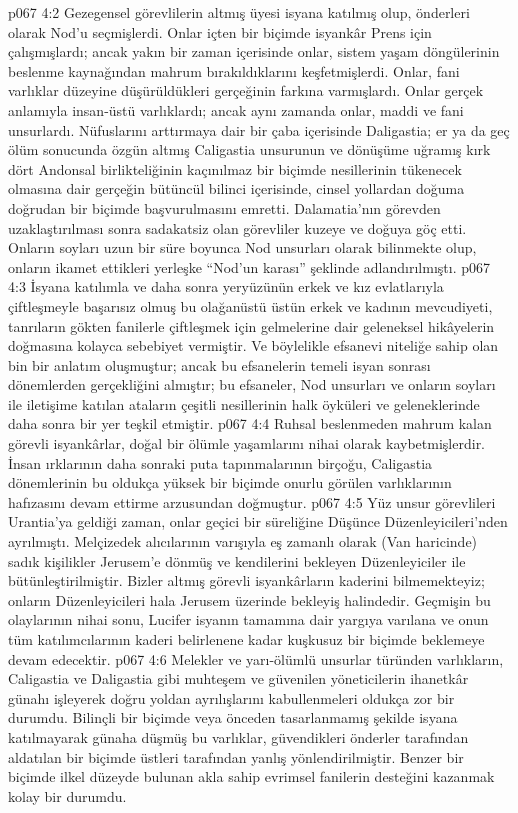 \vs p067 4:2 Gezegensel görevlilerin altmış üyesi isyana katılmış olup, önderleri olarak Nod’u seçmişlerdi. Onlar içten bir biçimde isyankâr Prens için çalışmışlardı; ancak yakın bir zaman içerisinde onlar, sistem yaşam döngülerinin beslenme kaynağından mahrum bırakıldıklarını keşfetmişlerdi. Onlar, fani varlıklar düzeyine düşürüldükleri gerçeğinin farkına varmışlardı. Onlar gerçek anlamıyla insan\hyp{}üstü varlıklardı; ancak aynı zamanda onlar, maddi ve fani unsurlardı. Nüfuslarını arttırmaya dair bir çaba içerisinde Daligastia; er ya da geç ölüm sonucunda özgün altmış Caligastia unsurunun ve dönüşüme uğramış kırk dört Andonsal birlikteliğinin kaçınılmaz bir biçimde nesillerinin tükenecek olmasına dair gerçeğin bütüncül bilinci içerisinde, cinsel yollardan doğuma doğrudan bir biçimde başvurulmasını emretti. Dalamatia’nın görevden uzaklaştırılması sonra sadakatsiz olan görevliler kuzeye ve doğuya göç etti. Onların soyları uzun bir süre boyunca Nod unsurları olarak bilinmekte olup, onların ikamet ettikleri yerleşke “Nod’un karası” şeklinde adlandırılmıştı.
\vs p067 4:3 İsyana katılımla ve daha sonra yeryüzünün erkek ve kız evlatlarıyla çiftleşmeyle başarısız olmuş bu olağanüstü üstün erkek ve kadının mevcudiyeti, tanrıların gökten fanilerle çiftleşmek için gelmelerine dair geleneksel hikâyelerin doğmasına kolayca sebebiyet vermiştir. Ve böylelikle efsanevi niteliğe sahip olan bin bir anlatım oluşmuştur; ancak bu efsanelerin temeli isyan sonrası dönemlerden gerçekliğini almıştır; bu efsaneler, Nod unsurları ve onların soyları ile iletişime katılan ataların çeşitli nesillerinin halk öyküleri ve geleneklerinde daha sonra bir yer teşkil etmiştir.
\vs p067 4:4 Ruhsal beslenmeden mahrum kalan görevli isyankârlar, doğal bir ölümle yaşamlarını nihai olarak kaybetmişlerdir. İnsan ırklarının daha sonraki puta tapınmalarının birçoğu, Caligastia dönemlerinin bu oldukça yüksek bir biçimde onurlu görülen varlıklarının hafızasını devam ettirme arzusundan doğmuştur.
\vs p067 4:5 Yüz unsur görevlileri Urantia’ya geldiği zaman, onlar geçici bir süreliğine Düşünce Düzenleyicileri’nden ayrılmıştı. Melçizedek alıcılarının varışıyla eş zamanlı olarak (Van haricinde) sadık kişilikler Jerusem’e dönmüş ve kendilerini bekleyen Düzenleyiciler ile bütünleştirilmiştir. Bizler altmış görevli isyankârların kaderini bilmemekteyiz; onların Düzenleyicileri hala Jerusem üzerinde bekleyiş halindedir. Geçmişin bu olaylarının nihai sonu, Lucifer isyanın tamamına dair yargıya varılana ve onun tüm katılımcılarının kaderi belirlenene kadar kuşkusuz bir biçimde beklemeye devam edecektir.
\vs p067 4:6 Melekler ve yarı\hyp{}ölümlü unsurlar türünden varlıkların, Caligastia ve Daligastia gibi muhteşem ve güvenilen yöneticilerin ihanetkâr günahı işleyerek doğru yoldan ayrılışlarını kabullenmeleri oldukça zor bir durumdu. Bilinçli bir biçimde veya önceden tasarlanmamış şekilde isyana katılmayarak günaha düşmüş bu varlıklar, güvendikleri önderler tarafından aldatılan bir biçimde üstleri tarafından yanlış yönlendirilmiştir. Benzer bir biçimde ilkel düzeyde bulunan akla sahip evrimsel fanilerin desteğini kazanmak kolay bir durumdu.
